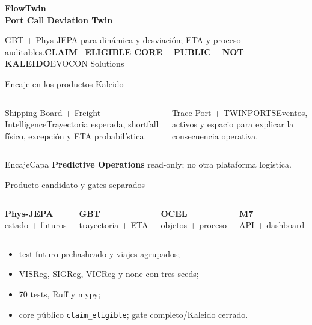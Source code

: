 \documentclass[aspectratio=169,10pt]{beamer}
\newcommand{\claim}{\colorbox{Gold!22}{\textcolor{Ink}{\scriptsize\bfseries CLAIM\_ELIGIBLE CORE -- PUBLIC -- NOT KALEIDO}}}
\newcommand{\bigmetric}[2]{\begin{center}{\color{Blue}\fontsize{25}{27}\selectfont\bfseries #1}\\[-1mm]{\scriptsize\color{Muted}#2}\end{center}}
\begin{document}
\begin{frame}[plain]\color{white}\vspace{5mm}\par{\fontsize{31}{32}\selectfont\bfseries FlowTwin\\Port Call Deviation Twin}\vspace{4mm}\par{\large GBT + Phys-JEPA para dinámica y desviación; ETA y proceso auditables.}\vfill\claim\hfill EVOCON Solutions\end{frame}
\begin{frame}{Encaje en los productos Kaleido}\begin{columns}[T]\begin{block}{Shipping Board + Freight Intelligence}Trayectoria esperada, shortfall físico, excepción y ETA probabilística.\end{block}\begin{block}{Trace Port + TWINPORTS}Eventos, activos y espacio para explicar la consecuencia operativa.\end{block}\end{columns}\vfill\begin{alertblock}{Encaje}Capa \textbf{Predictive Operations} read-only; no otra plataforma logística.\end{alertblock}\end{frame}
\begin{frame}{Producto candidato y gates separados}\begin{columns}\bigmetric{Phys-JEPA}{estado + futuros}\bigmetric{GBT}{trayectoria + ETA}\bigmetric{OCEL}{objetos + proceso}\bigmetric{M7}{API + dashboard}\end{columns}\vspace{3mm}\begin{itemize}\item test futuro prehasheado y viajes agrupados;\item VISReg, SIGReg, VICReg y none con tres seeds;\item 70 tests, Ruff y mypy;\item core público \texttt{claim\_eligible}; gate completo/Kaleido cerrado.\end{itemize}\end{frame}
\end{document}
